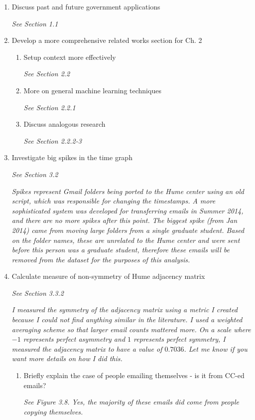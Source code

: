 \documentclass[12pt]{report}
\begin{document}
\begin{enumerate}
    \item Discuss past and future government applications
	\par \textit{See Section 1.1}

    \item Develop a more comprehensive related works section for Ch. 2
    \begin{enumerate}
        \item Setup context more effectively
        \par \textit{See Section 2.2}
        \item More on general machine learning techniques
        \par \textit{See Section 2.2.1}
        \item Discuss analogous research
        \par \textit{See Section 2.2.2-3}
    \end{enumerate}

    \item Investigate big spikes in the time graph
		\par \textit{See Section 3.2}
        \par \textit{Spikes represent Gmail folders being ported to the Hume center using an old script, which was responsible for changing the timestamps.  A more sophisticated system was developed for transferring emails in Summer 2014, and there are no more spikes after this point.  The biggest spike (from Jan 2014) came from moving large folders from a single graduate student.  Based on the folder names, these are unrelated to the Hume center and were sent before this person was a graduate student, therefore these emails will be removed from the dataset for the purposes of this analysis.}


	    \item Calculate measure of non-symmetry of Hume adjacency matrix
     	\par \textit{See Section 3.3.2}
	    \par \textit{I measured the symmetry of the adjacency matrix using a metric I created because I could not find anything similar 
	    	        in the literature.
			    	I used a weighted averaging scheme so that larger email counts mattered more.
	    	        On a scale where $-1$ represents perfect asymmetry and $1$ represents perfect symmetry, I measured the adjacency matrix to have a value of $0.7036$.
	    	        Let me know if you want more details on how I did this.}
    \begin{enumerate}	    
		\item Briefly explain the case of people emailing themselves - is it from CC-ed emails?
		\par \textit{See Figure 3.8.  Yes, the majority of these emails did come from people copying themselves.}
	\end{enumerate}
	


\end{enumerate}
\end{document}
